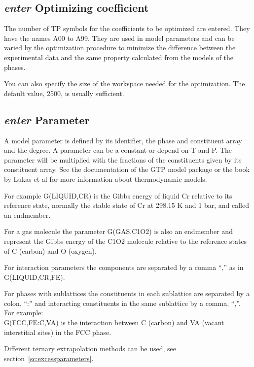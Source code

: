 \documentclass[11pt]{article}
\begin{document}
\hypertarget{Enter coeffs}{}
\subsection{{\em enter} Optimizing coefficient}\label{sc:optcoeff}

The number of TP symbols for the coefficients to be optimized are
entered.  They have the names A00 to A99.  They are used in model
parameters and can be varied by the optimization procedure to minimize
the difference between the experimental data and the same property
calculated from the models of the phases.

You can also specify the size of the workspace needed for the
optimization.  The default value, 2500, is usually sufficient.

\hypertarget{Enter parameter}{}
\subsection{{\em enter} Parameter}\label{sc:enterparam}

A model parameter is defined by its identifier, the phase and
constituent array and the degree.  A parameter can be a constant or
depend on T and P.  The parameter will be multiplied with the
fractions of the constituents given by its constituent array.  See the
documentation of the GTP model package or the book by Lukas et
al\cite{07Luk} for more information about thermodynamic models.

For example G(LIQUID,CR) is the Gibbs energy of liquid Cr relative to
its reference state, normally the stable state of Cr at 298.15 K and 1
bar, and called an endmember.

For a gas molecule the parameter G(GAS,C1O2) is also an endmember and
represent the Gibbs energy of the C1O2 molecule relative to the
reference states of C (carbon) and O (oxygen).

For interaction parameters the components are separated by a comma
``,'' as in G(LIQUID,CR,FE).

For phases with sublattices the constituents in each sublattice are
separated by a colon, ``:'' and interacting constituents in the same
sublattice by a comma, ``,''.  For example:\\
G(FCC,FE:C,VA) is the interaction between C (carbon) and VA (vacant
interstitial sites) in the FCC phase.

Different ternary extrapolation methods can be used, see
section~\ref{sc:excessparameters}.
\end{document}

